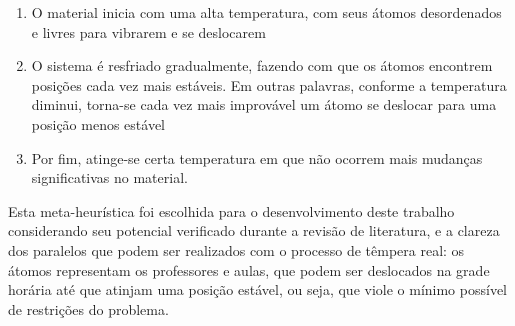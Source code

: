 \begin{enumerate}
	\item O material inicia com uma alta temperatura, com seus átomos desordenados e livres para vibrarem e se deslocarem
	\item O sistema é resfriado gradualmente, fazendo com que os átomos encontrem posições cada vez mais estáveis. Em outras palavras, conforme a temperatura diminui, torna-se cada vez mais improvável um átomo se deslocar para uma posição menos estável
	\item Por fim, atinge-se certa temperatura em que não ocorrem mais mudanças significativas no material. 
\end{enumerate}

Esta meta-heurística foi escolhida para o desenvolvimento deste trabalho considerando seu potencial verificado durante a revisão de literatura, e a clareza dos paralelos que podem ser realizados com o processo de têmpera real: os átomos representam os professores e aulas, que podem ser deslocados na grade horária até que atinjam uma posição estável, ou seja, que viole o mínimo possível de restrições do problema.


